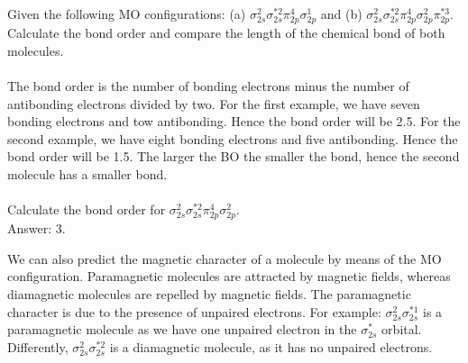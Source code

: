 \documentclass[main.tex]{subfiles}
\begin{document}
\begin{description}
\begin{example} %
Given the following MO configurations: (a) $\sigma^{2}_{2s}\sigma^{*2}_{2s}\pi^{4}_{2p}\sigma^{1}_{2p}$ and (b) $\sigma^{2}_{2s}\sigma^{*2}_{2s}\pi^{4}_{2p}\sigma^{2}_{2p}\pi^{*3}_{2p}$. Calculate the bond order and compare the length of the chemical bond of both molecules.\\ 
\\
The bond order is the number of bonding electrons minus the number of antibonding electrons divided by two. For the first example, we have seven bonding electrons and tow antibonding. Hence the bond order will be 2.5. For the second example, we have eight bonding electrons and five antibonding. Hence the bond order will be 1.5. The larger the BO the smaller the bond, hence the second molecule has a smaller bond.
\\
\faDiamond\ \\
Calculate the bond order for $\sigma^{2}_{2s}\sigma^{*2}_{2s}\pi^{4}_{2p}\sigma^{2}_{2p}$.\\
\flushright Answer: 3.
\end{example}%


\item[\docfilehook{Paramagnetism and diamagnetism}{Paramagnetism and diamagnetism}] We can also predict the magnetic character of a molecule by means of the MO configuration. Paramagnetic molecules are attracted by magnetic fields, whereas diamagnetic molecules are repelled by magnetic fields. The paramagnetic character is due to the presence of unpaired electrons. For example: $\sigma^{2}_{2s}\sigma^{*1}_{2s}$ is a paramagnetic molecule as we have one unpaired electron in the $\sigma^{*}_{2s}$ orbital. Differently, $\sigma^{2}_{2s}\sigma^{*2}_{2s}$ is a diamagnetic molecule, as it has no unpaired electrons.


\end{description}
\end{document}
